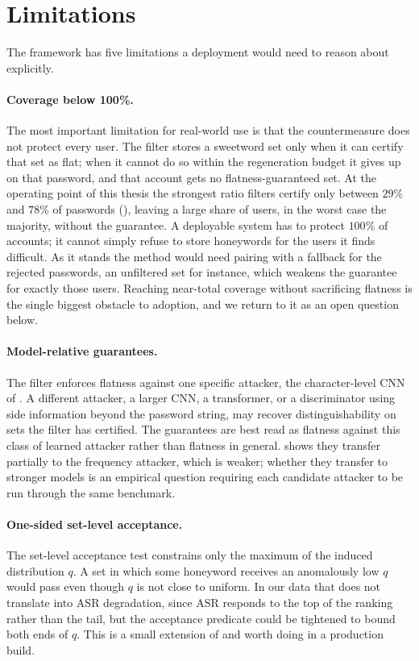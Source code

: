 \section{Limitations}
\label{sec:conclusion-limitations}

The framework has five limitations a deployment would need to reason
about explicitly.

\paragraph{Coverage below 100\%.}
The most important limitation for real-world use is that the
countermeasure does not protect every user. The filter stores a
sweetword set only when it can certify that set as flat; when it cannot
do so within the regeneration budget it gives up on that password, and
that account gets no flatness-guaranteed set. At the operating point of
this thesis the strongest ratio filters certify only between $29\%$ and
$78\%$ of passwords (), leaving a large share of users,
in the worst case the majority, without the guarantee. A deployable
system has to protect $100\%$ of accounts; it cannot simply refuse to
store honeywords for the users it finds difficult. As it stands the
method would need pairing with a fallback for the rejected passwords, an
unfiltered set for instance, which weakens the guarantee for exactly
those users. Reaching near-total coverage without sacrificing flatness
is the single biggest obstacle to adoption, and we return to it as an
open question below.

\paragraph{Model-relative guarantees.}
The filter enforces flatness against one specific attacker, the
character-level CNN of . A different attacker, a
larger CNN, a transformer, or a discriminator using side information
beyond the password string, may recover distinguishability on sets the
filter has certified. The guarantees are best read as flatness against
this class of learned attacker rather than flatness in general.
 shows they transfer partially to the frequency
attacker, which is weaker; whether they transfer to stronger models is
an empirical question requiring each candidate attacker to be run
through the same benchmark.

\paragraph{One-sided set-level acceptance.}
The set-level acceptance test constrains only the maximum of the induced
distribution $q$. A set in which some honeyword receives an anomalously
low $q$ would pass even though $q$ is not close to uniform. In our data
that does not translate into ASR degradation, since ASR responds to the
top of the ranking rather than the tail, but the acceptance predicate
could be tightened to bound both ends of $q$. This is a small extension
of  and worth doing in a production build.

